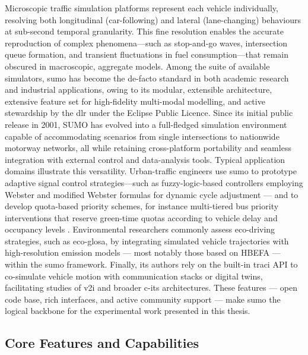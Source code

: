 Microscopic traffic simulation platforms represent each vehicle individually, resolving both longitudinal (car-following) and lateral (lane-changing) behaviours at sub-second temporal granularity. This fine resolution enables the accurate reproduction of complex phenomena—such as stop-and-go waves, intersection queue formation, and transient fluctuations in fuel consumption—that remain obscured in macroscopic, aggregate models. \cite{Koutsopoulos2005Microsim} Among the suite of available simulators, \ac{sumo} has become the de-facto standard in both academic research and industrial applications, owing to its modular, extensible architecture, extensive feature set for high-fidelity multi-modal modelling, and active stewardship by the \ac{dlr} under the Eclipse Public Licence. Since its initial public release in 2001, SUMO has evolved into a full-fledged simulation environment capable of accommodating scenarios from single intersections to nationwide motorway networks, all while retaining cross-platform portability and seamless integration with external control and data-analysis tools.  
\mynewline
Typical application domains illustrate this versatility. Urban-traffic engineers use \ac{sumo} to prototype adaptive signal control strategies—such as fuzzy-logic-based controllers employing Webster and modified Webster formulas for dynamic cycle adjustment \cite{Ali2021AdaptiveFuzzyWebster} --- and to develop quota-based priority schemes, for instance multi-tiered bus priority interventions that reserve green-time quotas according to vehicle delay and occupancy levels \cite{Schmidt2024BusPriority}.
Environmental researchers commonly assess eco-driving strategies, such as \ac{eco-glosa}, by integrating simulated vehicle trajectories with high-resolution emission models --- most notably those based on HBEFA --- within the \ac{sumo} framework. \cite{jayawardana2022learning,varga2024systematic}
Finally, \ac{its} authors rely on the built-in \ac{traci} API to
co-simulate vehicle motion with communication stacks or digital twins,
facilitating studies of \ac{v2i} and broader \ac{c-its} architectures. \cite{Sommer2008TraCI}
These features --- open code base, rich interfaces, and active community support --- make \ac{sumo}
the logical backbone for the experimental work presented in this thesis.


\subsection{Core Features and Capabilities}
\label{subsec:sumo_core_features}


